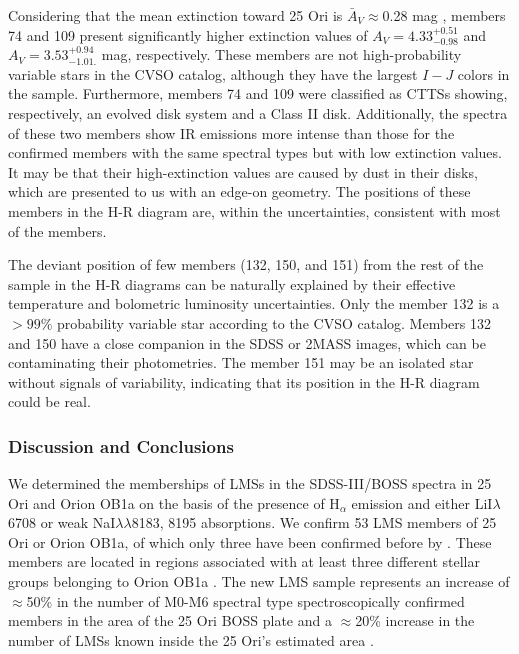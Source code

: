 \documentclass[12pt]{article}
\newcounter{subsubsubsection}[subsubsection]
\begin{document}
\label{sec_BOSS:high_extinction}

Considering that the mean extinction toward 25 Ori is $\bar{A}_V\approx$0.28 mag \citep{Kharchenko2005, Briceno2005, Briceno2007, Downes2014}, members 74 and 109 present significantly higher extinction values of $A_V=4.33^{+0.51}_{-0.98}$ and $A_V=3.53^{+0.94}_{-1.01.}$ mag, respectively. These members are not high-probability variable stars in the CVSO catalog, although they have the largest $I-J$ colors in the sample. Furthermore, members 74 and 109 were classified as CTTSs showing, respectively, an evolved disk system and a Class II disk. Additionally, the spectra of these two members show IR emissions more intense than those for the confirmed members with the same spectral types but with low extinction values. It may be that their high-extinction values are caused by dust in their disks, which are presented to us with an edge-on geometry. The positions of these members in the H-R diagram are, within the uncertainties, consistent with most of the members. 


The deviant position of few members (132, 150, and 151) from the rest of the sample in the H-R diagrams can be naturally explained by their effective temperature and bolometric luminosity uncertainties. Only the member 132 is a $>99\%$ probability variable star according to the CVSO catalog. Members 132 and 150 have a close companion in the SDSS or 2MASS images, which can be contaminating their photometries. The member 151 may be an isolated star without signals of variability, indicating that its position in the H-R diagram could be real.

\subsubsection{Discussion and Conclusions}
\label{sec_BOSS:summary}

We determined the memberships of LMSs in the SDSS-III/BOSS spectra in 25 Ori and Orion OB1a on the basis of the presence of H$_\alpha$ emission and either LiI$\lambda$6708 or weak NaI$\lambda\lambda$8183, 8195 absorptions. We confirm 53 LMS members of 25 Ori or Orion OB1a, of which only three have been confirmed before by \citet{Downes2014}. These members are located in regions associated with at least three different stellar groups belonging to Orion OB1a \citep[25 Ori, ASCC 18, and ASCC 20; ][]{Kharchenko2005,Kharchenko2013}. The new LMS sample represents an increase of $\approx$50\% in the number of M0-M6 spectral type spectroscopically confirmed members in the area of the 25 Ori BOSS plate and a $\approx$20\% increase in the number of LMSs known inside the 25 Ori's estimated area \citep[1$^\circ$ radius; ][]{Briceno2005,Briceno2007}.
\end{document}
